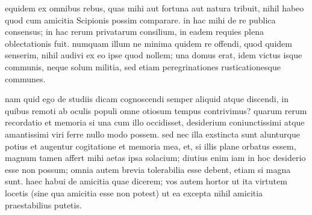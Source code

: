  equidem ex omnibus rebus, quas mihi aut fortuna aut natura tribuit, nihil habeo quod cum amicitia Scipionis possim comparare. in hac mihi de re publica consensus; in hac rerum privatarum consilium, in eadem requies plena oblectationis fuit. numquam illum ne minima quidem re offendi, quod quidem senserim, nihil audivi ex eo ipse quod nollem; una domus erat, idem victus isque communis, neque solum militia, sed etiam peregrinationes rusticationesque communes.

 nam quid ego de studiis dicam cognoscendi semper aliquid atque discendi, in quibus remoti ab oculis populi omne otiosum tempus contrivimus? quarum rerum recordatio et memoria si una cum illo occidisset, desiderium coniunctissimi atque amantissimi viri ferre nullo modo possem. sed nec illa exstincta sunt alunturque potius et augentur cogitatione et memoria mea, et, si illis plane orbatus essem, magnum tamen affert mihi aetas ipsa solacium; diutius enim iam in hoc desiderio esse non possum; omnia autem brevia tolerabilia esse debent, etiam si magna sunt. haec habui de amicitia quae dicerem; vos autem hortor ut ita virtutem locetis (sine qua amicitia esse non potest) ut ea excepta nihil amicitia praestabilius putetis.
